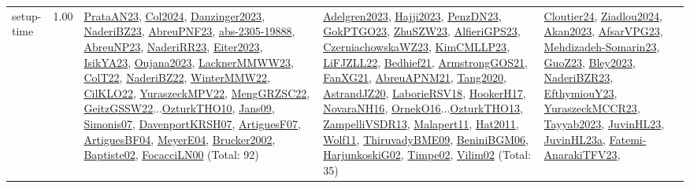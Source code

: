 {\begin{longtable}{p{3cm}r>{\raggedright\arraybackslash}p{6cm}>{\raggedright\arraybackslash}p{6cm}>{\raggedright\arraybackslash}p{8cm}}
\index{setup-time}\index{Concepts!setup-time}setup-time &  1.00 & \hyperref[detail:PrataAN23]{PrataAN23}, \hyperref[detail:Col2024]{Col2024}, \hyperref[detail:Danzinger2023]{Danzinger2023}, \hyperref[detail:NaderiBZ23]{NaderiBZ23}, \hyperref[detail:AbreuPNF23]{AbreuPNF23}, \hyperref[detail:abs-2305-19888]{abs-2305-19888}, \hyperref[detail:AbreuNP23]{AbreuNP23}, \hyperref[detail:NaderiRR23]{NaderiRR23}, \hyperref[detail:Eiter2023]{Eiter2023}, \hyperref[detail:IsikYA23]{IsikYA23}, \hyperref[detail:Oujana2023]{Oujana2023}, \hyperref[detail:LacknerMMWW23]{LacknerMMWW23}, \hyperref[detail:ColT22]{ColT22}, \hyperref[detail:NaderiBZ22]{NaderiBZ22}, \hyperref[detail:WinterMMW22]{WinterMMW22}, \hyperref[detail:CilKLO22]{CilKLO22}, \hyperref[detail:YuraszeckMPV22]{YuraszeckMPV22}, \hyperref[detail:MengGRZSC22]{MengGRZSC22}, \hyperref[detail:GeitzGSSW22]{GeitzGSSW22}...\hyperref[detail:OzturkTHO10]{OzturkTHO10}, \hyperref[detail:Jans09]{Jans09}, \hyperref[detail:Simonis07]{Simonis07}, \hyperref[detail:DavenportKRSH07]{DavenportKRSH07}, \hyperref[detail:ArtiguesF07]{ArtiguesF07}, \hyperref[detail:ArtiguesBF04]{ArtiguesBF04}, \hyperref[detail:MeyerE04]{MeyerE04}, \hyperref[detail:Brucker2002]{Brucker2002}, \hyperref[detail:Baptiste02]{Baptiste02}, \hyperref[detail:FocacciLN00]{FocacciLN00} (Total: 92) & \hyperref[detail:Adelgren2023]{Adelgren2023}, \hyperref[detail:Hajji2023]{Hajji2023}, \hyperref[detail:PenzDN23]{PenzDN23}, \hyperref[detail:GokPTGO23]{GokPTGO23}, \hyperref[detail:ZhuSZW23]{ZhuSZW23}, \hyperref[detail:AlfieriGPS23]{AlfieriGPS23}, \hyperref[detail:CzerniachowskaWZ23]{CzerniachowskaWZ23}, \hyperref[detail:KimCMLLP23]{KimCMLLP23}, \hyperref[detail:LiFJZLL22]{LiFJZLL22}, \hyperref[detail:Bedhief21]{Bedhief21}, \hyperref[detail:ArmstrongGOS21]{ArmstrongGOS21}, \hyperref[detail:FanXG21]{FanXG21}, \hyperref[detail:AbreuAPNM21]{AbreuAPNM21}, \hyperref[detail:Tang2020]{Tang2020}, \hyperref[detail:AstrandJZ20]{AstrandJZ20}, \hyperref[detail:LaborieRSV18]{LaborieRSV18}, \hyperref[detail:HookerH17]{HookerH17}, \hyperref[detail:NovaraNH16]{NovaraNH16}, \hyperref[detail:OrnekO16]{OrnekO16}...\hyperref[detail:OzturkTHO13]{OzturkTHO13}, \hyperref[detail:ZampelliVSDR13]{ZampelliVSDR13}, \hyperref[detail:Malapert11]{Malapert11}, \hyperref[detail:Hat2011]{Hat2011}, \hyperref[detail:Wolf11]{Wolf11}, \hyperref[detail:ThiruvadyBME09]{ThiruvadyBME09}, \hyperref[detail:BeniniBGM06]{BeniniBGM06}, \hyperref[detail:HarjunkoskiG02]{HarjunkoskiG02}, \hyperref[detail:Timpe02]{Timpe02}, \hyperref[detail:Vilim02]{Vilim02} (Total: 35) & \hyperref[detail:Cloutier24]{Cloutier24}, \hyperref[detail:Ziadlou2024]{Ziadlou2024}, \hyperref[detail:Akan2023]{Akan2023}, \hyperref[detail:AfsarVPG23]{AfsarVPG23}, \hyperref[detail:Mehdizadeh-Somarin23]{Mehdizadeh-Somarin23}, \hyperref[detail:GuoZ23]{GuoZ23}, \hyperref[detail:Bley2023]{Bley2023}, \hyperref[detail:NaderiBZR23]{NaderiBZR23}, \hyperref[detail:EfthymiouY23]{EfthymiouY23}, \hyperref[detail:YuraszeckMCCR23]{YuraszeckMCCR23}, \hyperref[detail:Tayyab2023]{Tayyab2023}, \hyperref[detail:JuvinHL23]{JuvinHL23}, \hyperref[detail:JuvinHL23a]{JuvinHL23a}, \hyperref[detail:Fatemi-AnarakiTFV23]{Fatemi-AnarakiTFV23}, 
\end{longtable}}

